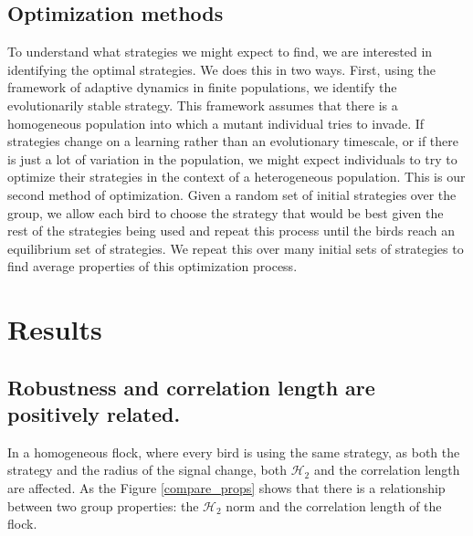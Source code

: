 \documentclass{article}
\begin{document}
\subsection{Optimization methods }
To understand what strategies we might expect to find, we are interested in identifying the optimal strategies.  We does this in two ways.  First, using the framework of adaptive dynamics in finite populations, we identify the evolutionarily stable strategy.  This framework assumes that there is a homogeneous population into which a mutant individual tries to invade.  If strategies change on a learning rather than an evolutionary timescale, or if there is just a lot of variation in the population, we might expect individuals to try to optimize their strategies in the context of a heterogeneous population.  This is our second method of optimization. Given a random set of initial strategies over the group, we allow each bird to choose the strategy that would be best given the rest of the strategies being used and repeat this process until the birds reach an equilibrium set of strategies. We repeat this over many initial sets of strategies to find average properties of this optimization process.

\section{Results }

\subsection{Robustness and correlation length are positively related. }
In a homogeneous flock, where every bird is using the same strategy, as both the strategy and the radius of the signal change, both $\mathscr{H}_2$ and the correlation length are affected.  As the Figure \ref{compare_props} shows that there is a relationship between two group properties: the $\mathscr{H}_2$ norm and the correlation length of the flock.
\end{document}

